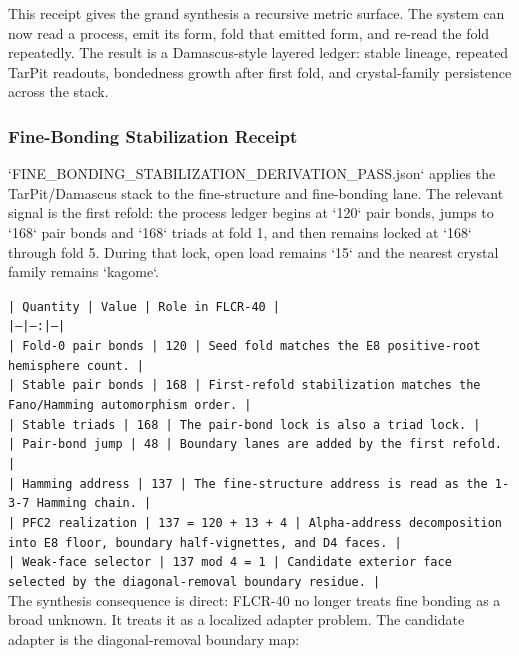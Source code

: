 \documentclass[11pt]{article}
\begin{document}
This receipt gives the grand synthesis a recursive metric surface. The system can now read a process, emit its form, fold that emitted form, and re-read the fold repeatedly. The result is a Damascus-style layered ledger: stable lineage, repeated TarPit readouts, bondedness growth after first fold, and crystal-family persistence across the stack.

\subsubsection*{Fine-Bonding Stabilization Receipt}

`FINE\_BONDING\_STABILIZATION\_DERIVATION\_PASS.json` applies the TarPit/Damascus stack to the fine-structure and fine-bonding lane. The relevant signal is the first refold: the process ledger begins at `120` pair bonds, jumps to `168` pair bonds and `168` triads at fold 1, and then remains locked at `168` through fold 5. During that lock, open load remains `15` and the nearest crystal family remains `kagome`.

\noindent\texttt{| Quantity | Value | Role in FLCR-40 |}\\
\noindent\texttt{|---|---:|---|}\\
\noindent\texttt{| Fold-0 pair bonds | 120 | Seed fold matches the E8 positive-root hemisphere count. |}\\
\noindent\texttt{| Stable pair bonds | 168 | First-refold stabilization matches the Fano/Hamming automorphism order. |}\\
\noindent\texttt{| Stable triads | 168 | The pair-bond lock is also a triad lock. |}\\
\noindent\texttt{| Pair-bond jump | 48 | Boundary lanes are added by the first refold. |}\\
\noindent\texttt{| Hamming address | 137 | The fine-structure address is read as the 1-3-7 Hamming chain. |}\\
\noindent\texttt{| PFC2 realization | 137 = 120 + 13 + 4 | Alpha-address decomposition into E8 floor, boundary half-vignettes, and D4 faces. |}\\
\noindent\texttt{| Weak-face selector | 137 mod 4 = 1 | Candidate exterior face selected by the diagonal-removal boundary residue. |}\\

The synthesis consequence is direct: FLCR-40 no longer treats fine bonding as a broad unknown. It treats it as a localized adapter problem. The candidate adapter is the diagonal-removal boundary map:
\end{document}
